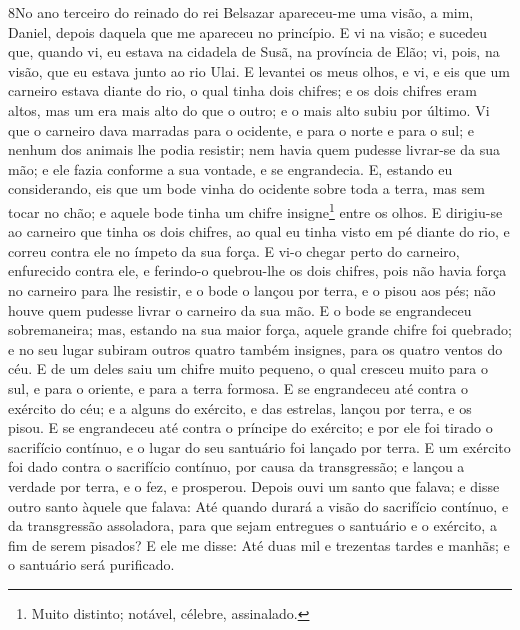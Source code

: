 \lettrine{8} No ano terceiro do reinado do rei Belsazar
apareceu-me uma visão, a mim, Daniel, depois daquela que me apareceu
no princípio. E vi na visão; e sucedeu que, quando vi, eu estava
na cidadela de Susã, na província de Elão; vi, pois, na visão, que
eu estava junto ao rio Ulai. E levantei os meus olhos, e vi, e
eis que um carneiro estava diante do rio, o qual tinha dois chifres;
e os dois chifres eram altos, mas um era mais alto do que o outro; e
o mais alto subiu por último. Vi que o carneiro dava marradas
para o ocidente, e para o norte e para o sul; e nenhum dos animais
lhe podia resistir; nem havia quem pudesse livrar-se da sua mão; e
ele fazia conforme a sua vontade, e se engrandecia. E, estando
eu considerando, eis que um bode vinha do ocidente sobre toda a
terra, mas sem tocar no chão; e aquele bode tinha um chifre
insigne\footnote{Muito distinto; notável, célebre, assinalado.}
entre os olhos. E dirigiu-se ao carneiro que tinha os dois
chifres, ao qual eu tinha visto em pé diante do rio, e correu contra
ele no ímpeto da sua força. E vi-o chegar perto do carneiro,
enfurecido contra ele, e ferindo-o quebrou-lhe os dois chifres, pois
não havia força no carneiro para lhe resistir, e o bode o lançou por
terra, e o pisou aos pés; não houve quem pudesse livrar o carneiro
da sua mão. E o bode se engrandeceu sobremaneira; mas, estando
na sua maior força, aquele grande chifre foi quebrado; e no seu
lugar subiram outros quatro também insignes, para os quatro ventos
do céu. E de um deles saiu um chifre muito pequeno, o qual
cresceu muito para o sul, e para o oriente, e para a terra formosa.
E se engrandeceu até contra o exército do céu; e a alguns do
exército, e das estrelas, lançou por terra, e os pisou. E se
engrandeceu até contra o príncipe do exército; e por ele foi tirado
o sacrifício contínuo, e o lugar do seu santuário foi lançado por
terra. E um exército foi dado contra o sacrifício contínuo,
por causa da transgressão; e lançou a verdade por terra, e o fez, e
prosperou. Depois ouvi um santo que falava; e disse outro
santo àquele que falava: Até quando durará a visão do sacrifício
contínuo, e da transgressão assoladora, para que sejam entregues o
santuário e o exército, a fim de serem pisados? E ele me
disse: Até duas mil e trezentas tardes e manhãs; e o santuário será
purificado.

